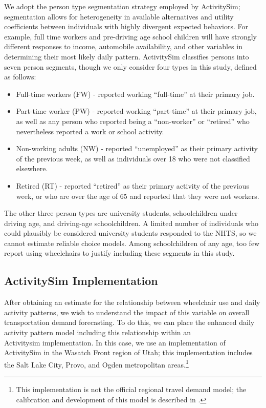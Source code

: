 \documentclass[3p, authoryear, review]{elsarticle} %
\providecommand{\tightlist}{%
  \setlength{\itemsep}{0pt}\setlength{\parskip}{0pt}}
\begin{document}
We adopt the person type segmentation strategy employed by ActivitySim;
segmentation allows for heterogeneity in available alternatives and utility
coefficients between individuals with highly divergent expected behaviors. For
example, full time workers and pre-driving age school children will have
strongly different responses to income, automobile availability, and other
variables in determining their most likely daily pattern.
ActivitySim classifies persons into seven person segments, though we only
consider four types in this study, defined as follows:

\begin{itemize}
\tightlist
\item
  Full-time workers (FW) - reported working ``full-time'' at their primary job.
\item
  Part-time worker (PW) - reported working ``part-time'' at their primary job,
  as well as any person who reported being a ``non-worker'' or ``retired'' who nevertheless
  reported a work or school activity.
\item
  Non-working adults (NW) - reported ``unemployed'' as their primary activity
  of the previous week, as well as individuals over 18 who were not classified
  elsewhere.
\item
  Retired (RT) - reported ``retired'' as their primary activity of the previous
  week, or who are over the age of 65 and reported that they were not workers.
\end{itemize}

The other three person types are university students, schoolchildren under
driving age, and driving-age schoolchildren. A limited number of individuals who
could plausibly be considered university students responded to the NHTS, so we
cannot estimate reliable choice models. Among schoolchildren of any age, too few
report using wheelchairs to justify including these segments in this study.

\hypertarget{activitysim-implementation}{%
\subsection{ActivitySim Implementation}\label{activitysim-implementation}}

After obtaining an estimate for the relationship between wheelchair use and
daily activity patterns, we wish to understand the impact of this variable on
overall transportation demand forecasting. To do this, we can place the
enhanced daily activity pattern model including this relationship within an\\
Activitysim implementation. In this case, we use an implementation of ActivitySim
in the Wasatch Front region of Utah; this implementation includes the Salt Lake
City, Provo, and Ogden metropolitan areas.\footnote{This implementation is not the
  official regional travel demand model; the calibration and development of this
  model is described in \citep{udotwheelchairs}.}
\end{document}
